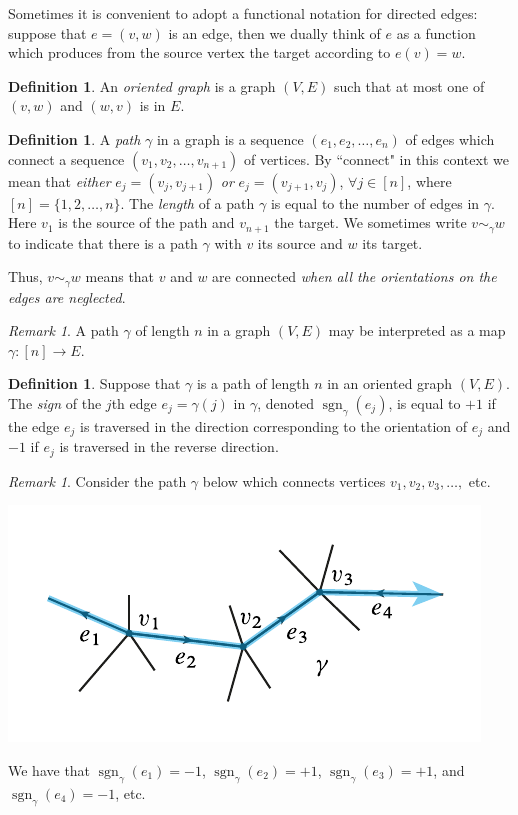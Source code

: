\documentclass[12pt]{amsart}
\newcommand{\sgn}{\operatorname{sgn}}
\theoremstyle{definition}
\newtheorem{definition}[theorem]{Definition}
\theoremstyle{remark}
\newtheorem{remark}[theorem]{Remark}
\numberwithin{equation}{section}
\begin{document}
Sometimes it is convenient to adopt a functional notation for directed edges: suppose that $e=(v,w)$ is an edge, then we dually think of $e$ as a function which produces from the source vertex the target according to $e(v) = w$.
 
\begin{definition}
	An \emph{oriented graph} is a graph $(V, E)$ such that at most one of $(v,w)$ and $(w,v)$ is in $E$.
\end{definition}

\begin{definition}
	A \emph{path} $\gamma$ in a graph is a sequence $(e_1, e_2, \ldots, e_n)$ of edges which connect a sequence $(v_1, v_2, \ldots, v_{n+1})$ of vertices. By ``connect" in this context we mean that \emph{either} $e_j = (v_j, v_{j+1})$ \emph{or} $e_j = (v_{j+1}, v_{j})$,  $\forall j \in [n]$, where $[n] = \{1,2, \ldots, n\}$. The \emph{length} of a path $\gamma$ is equal to the number of edges in $\gamma$. Here $v_1$ is the source of the path and $v_{n+1}$ the target. We sometimes write $v\sim_\gamma w$ to indicate that there is a path $\gamma$ with $v$ its source and $w$ its target. 
\end{definition}
Thus,  $v\sim_\gamma w$ means that $v$ and $w$ are connected \emph{when all the orientations on the edges are neglected}.

\begin{remark}
A path $\gamma$ of length $n$ in a graph $(V,E)$ may be interpreted as a map $\gamma: [n] \rightarrow E$.
\end{remark}


\begin{definition}
	Suppose that $\gamma$ is a path of length $n$ in an oriented graph $(V,E)$. The \emph{sign} of the $j$th edge $e_j = \gamma(j)$ in $\gamma$, denoted $\sgn_\gamma(e_j)$, is equal to $+1$ if the edge $e_j$ is traversed in the direction corresponding to the orientation of $e_j$ and $-1$ if $e_j$ is traversed in the reverse direction.
\end{definition}

\begin{remark}
	Consider the path $\gamma$ below which connects vertices $v_1, v_2, v_3, \ldots,$ etc.
\begin{center}
	\includegraphics{path.pdf}
\end{center} 
We have that $\sgn_\gamma(e_1) = -1$, $\sgn_\gamma(e_2) = +1$, $\sgn_\gamma(e_3) = +1$, and $\sgn_\gamma(e_4) = -1$, etc.

\end{remark}
\end{document}
